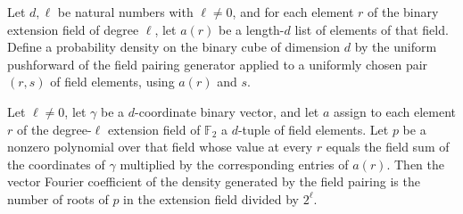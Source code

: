 \begin{definition}
\label{FABL.fieldPairingDensity}
\leanok
{}
Let $d,\ell$ be natural numbers with $\ell\ne0$, and for each element $r$ of the binary
extension field of degree $\ell$, let $a(r)$ be a length-$d$ list of elements of that
field. Define a probability density on the binary cube of dimension $d$ by the uniform
pushforward of the field pairing generator applied to a uniformly chosen pair $(r,s)$ of
field elements, using $a(r)$ and $s$.
\end{definition}

\begin{theorem}
\label{FABL.vectorFourierCoeff_fieldPairingDensity_eq_rootProbability}
\leanok
{}
Let $\ell\ne0$, let $\gamma$ be a $d$-coordinate binary vector, and let $a$ assign to
each element $r$ of the degree-$\ell$ extension field of $\mathbb{F}_2$ a $d$-tuple of
field elements. Let $p$ be a nonzero polynomial over that field whose value at every $r$
equals the field sum of the coordinates of $\gamma$ multiplied by the corresponding
entries of $a(r)$. Then the vector Fourier coefficient of the density generated by the
field pairing is the number of roots of $p$ in the extension field divided by $2^\ell$.
\end{theorem}

